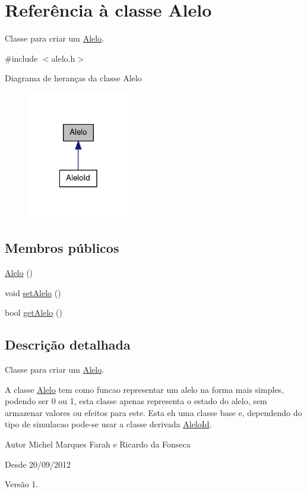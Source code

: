 \hypertarget{class_alelo}{\section{\-Referência à classe \-Alelo}
\label{class_alelo}
}


\-Classe para criar um \hyperlink{class_alelo}{\-Alelo}.  




{\ttfamily \#include $<$alelo.\-h$>$}



\-Diagrama de heranças da classe \-Alelo\nopagebreak
\begin{figure}[H]
\begin{center}
\leavevmode
\includegraphics[width=126pt]{class_alelo__inherit__graph}
\end{center}
\end{figure}
\subsection*{\-Membros públicos}
\begin{DoxyCompactItemize}
\item 
\hyperlink{class_alelo_ab6a90be65041317c92a8976f4171cf62}{\-Alelo} ()
\item 
void \hyperlink{class_alelo_af01729982dc5849d6a6471383a30d918}{set\-Alelo} ()
\item 
bool \hyperlink{class_alelo_ace28885d23438e74674c3a7d68f5ea26}{get\-Alelo} ()
\end{DoxyCompactItemize}


\subsection{\-Descrição detalhada}
\-Classe para criar um \hyperlink{class_alelo}{\-Alelo}. 

\-A classe \hyperlink{class_alelo}{\-Alelo} tem como funcao representar um alelo na forma mais simples, podendo ser 0 ou 1, esta classe apenas representa o estado do alelo, sem armazenar valores ou efeitos para este. \-Esta eh uma classe base e, dependendo do tipo de simulacao pode-\/se usar a classe derivada \hyperlink{class_alelo_id}{\-Alelo\-Id}. \begin{DoxyAuthor}{\-Autor}
\-Michel \-Marques \-Farah e \-Ricardo da \-Fonseca 
\end{DoxyAuthor}
\begin{DoxySince}{\-Desde}
20/09/2012 
\end{DoxySince}
\begin{DoxyVersion}{\-Versão}
1. 
\end{DoxyVersion}


